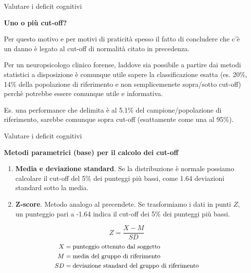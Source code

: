 \documentclass[
  ignorenonframetext,
]{beamer}
\begin{document}
\begin{frame}{Valutare i deficit cognitivi}
\label{valutare-i-deficit-cognitivi-35}
\begin{center}
  \textbf{Uno o più cut-off?}
\end{center}

Per questo motivo e per motivi di praticità spesso il fatto di
concludere che c'è un danno è legato al cut-off di normalità citato in
precedenza.

Per un neuropsicologo clinico forense, laddove sia possibile a partire
dai metodi statistici a disposizione è comunque utile sapere la
classificazione esatta (es. 20\%, 14\% della popolazione di riferimento
e non semplicemenete sopra/sotto cut-off) perchè potrebbe essere
comunque utile e informativa.

Es. una performance che delimita è al 5.1\% del campione/popolazione di
riferimento, sarebbe comunque sopra cut-off (esattamente come una al
95\%).
\end{frame}

\begin{frame}{Valutare i deficit cognitivi}
\label{valutare-i-deficit-cognitivi-36}
\begin{center}
  \textbf{Metodi parametrici (base) per il calcolo dei cut-off}
\end{center}

\begin{enumerate}
[1)]
\item
  \textbf{Media e deviazione standard}. Se la distribuzione è normale
  possiamo calcolare il cut-off del 5\% dei punteggi più bassi, come
  1.64 deviazioni standard sotto la media.
\item
  \textbf{Z-score}. Metodo analogo al precendete. Se trasformiamo i dati
  in punti \(Z\), un punteggio pari a -1.64 indica il cut-off dei 5\%
  dei punteggi più bassi.
\end{enumerate}

\[
Z = \frac{X - M}{SD}
\] \[
\small
\begin{aligned}
X & = \text{punteggio ottenuto dal soggetto} \\
M & = \text{media del gruppo di riferimento} \\
SD & = \text{deviazione standard del gruppo di riferimento} \\
\end{aligned}
\]
\end{frame}
\end{document}

